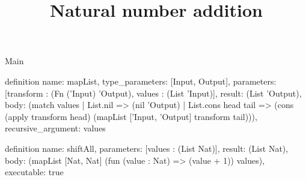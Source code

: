 \begin{lexlean}{Main}
\title{Natural number addition}
\begin{semanticmodule}
definition{
  name: mapList,
  type_parameters: [Input, Output],
  parameters: [transform : (Fn ('Input) 'Output), values : (List 'Input)],
  result: (List 'Output),
  body: (match values
    | List.nil => (nil 'Output)
    | List.cons head tail => (cons (apply transform head) (mapList ['Input, 'Output] transform tail))),
  recursive_argument: values
}

definition{
  name: shiftAll,
  parameters: [values : (List Nat)],
  result: (List Nat),
  body: (mapList [Nat, Nat] (fun (value : Nat) => (value + 1)) values),
  executable: true
}
\end{semanticmodule}
\end{lexlean}
